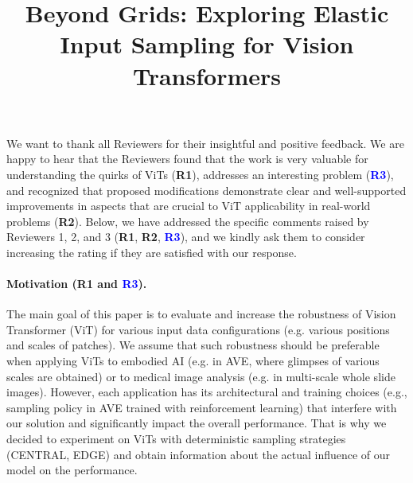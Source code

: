 \documentclass[10pt,twocolumn,letterpaper]{article}
\begin{document}
\title{Beyond Grids: Exploring Elastic Input Sampling for Vision Transformers}  %


\maketitle
\thispagestyle{empty}
\appendix

\newcommand{\Rone}{{\textbf{\textcolor{JungleGreen}{R1}}}}
\newcommand{\Rtwo}{{\textbf{\textcolor{BurntOrange}{R2}}}}
\newcommand{\Rthree}{{\textbf{\textcolor{Blue}{R3}}}}
\newcommand\todo[1]{\textcolor{red}{[#1]}}



We want to thank all Reviewers for their insightful and positive feedback. We are happy to hear that the Reviewers found that the work is very valuable for understanding the quirks of ViTs (\Rone), addresses an interesting problem (\Rthree), and recognized that proposed modifications demonstrate clear and well-supported improvements in aspects that are crucial to ViT applicability in real-world problems (\Rtwo). Below, we have addressed the specific comments raised by Reviewers 1, 2, and 3 (\Rone, \Rtwo, \Rthree), and we kindly ask them to consider increasing the rating if they are satisfied with our response.

\vspace{-0.05in}
\paragraph{Motivation (\Rone{} and \Rthree{}).}
The main goal of this paper is to evaluate and increase the robustness of Vision Transformer (ViT) for various input data configurations (e.g. various positions and scales of patches). We assume that such robustness should be preferable when applying ViTs to embodied AI (e.g. in AVE, where glimpses of various scales are obtained) or to medical image analysis (e.g. in multi-scale whole slide images).
However, each application has its architectural and training choices (e.g., sampling policy in AVE trained with reinforcement learning) that interfere with our solution and significantly impact the overall performance. That is why we decided to experiment on ViTs with deterministic sampling strategies (CENTRAL, EDGE) and obtain information about the actual influence of our model on the performance.

\vspace{-0.05in}
\end{document}
